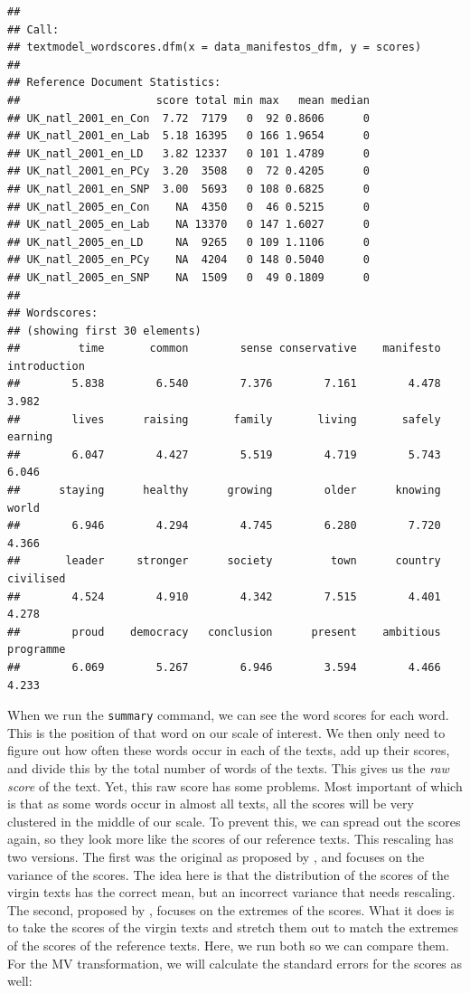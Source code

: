 \documentclass[
]{article}
\begin{document}
\begin{verbatim}
## 
## Call:
## textmodel_wordscores.dfm(x = data_manifestos_dfm, y = scores)
## 
## Reference Document Statistics:
##                     score total min max   mean median
## UK_natl_2001_en_Con  7.72  7179   0  92 0.8606      0
## UK_natl_2001_en_Lab  5.18 16395   0 166 1.9654      0
## UK_natl_2001_en_LD   3.82 12337   0 101 1.4789      0
## UK_natl_2001_en_PCy  3.20  3508   0  72 0.4205      0
## UK_natl_2001_en_SNP  3.00  5693   0 108 0.6825      0
## UK_natl_2005_en_Con    NA  4350   0  46 0.5215      0
## UK_natl_2005_en_Lab    NA 13370   0 147 1.6027      0
## UK_natl_2005_en_LD     NA  9265   0 109 1.1106      0
## UK_natl_2005_en_PCy    NA  4204   0 148 0.5040      0
## UK_natl_2005_en_SNP    NA  1509   0  49 0.1809      0
## 
## Wordscores:
## (showing first 30 elements)
##         time       common        sense conservative    manifesto introduction 
##        5.838        6.540        7.376        7.161        4.478        3.982 
##        lives      raising       family       living       safely      earning 
##        6.047        4.427        5.519        4.719        5.743        6.046 
##      staying      healthy      growing        older      knowing        world 
##        6.946        4.294        4.745        6.280        7.720        4.366 
##       leader     stronger      society         town      country    civilised 
##        4.524        4.910        4.342        7.515        4.401        4.278 
##        proud    democracy   conclusion      present    ambitious    programme 
##        6.069        5.267        6.946        3.594        4.466        4.233
\end{verbatim}

When we run the \texttt{summary} command, we can see the word scores for each word. This is the position of that word on our scale of interest. We then only need to figure out how often these words occur in each of the texts, add up their scores, and divide this by the total number of words of the texts. This gives us the \emph{raw score} of the text. Yet, this raw score has some problems. Most important of which is that as some words occur in almost all texts, all the scores will be very clustered in the middle of our scale. To prevent this, we can spread out the scores again, so they look more like the scores of our reference texts. This rescaling has two versions. The first was the original as proposed by \textcite{Laver2003a}, and focuses on the variance of the scores. The idea here is that the distribution of the scores of the virgin texts has the correct mean, but an incorrect variance that needs rescaling. The second, proposed by \textcite{Martin2008a}, focuses on the extremes of the scores. What it does is to take the scores of the virgin texts and stretch them out to match the extremes of the scores of the reference texts. Here, we run both so we can compare them. For the MV transformation, we will calculate the standard errors for the scores as well:
\end{document}
